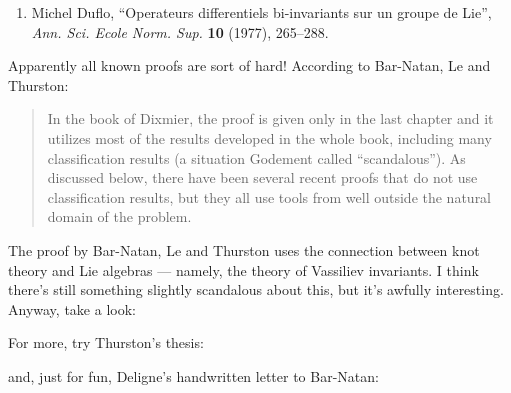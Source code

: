 \documentclass{article}
\def\tightlist{}
\renewcommand{\texttt}[1]{%
  \begingroup
  \ttfamily
  \begingroup\lccode`~=`/\lowercase{\endgroup\def~}{/\discretionary{}{}{}}%
  \begingroup\lccode`~=`[\lowercase{\endgroup\def~}{[\discretionary{}{}{}}%
  \begingroup\lccode`~=`.\lowercase{\endgroup\def~}{.\discretionary{}{}{}}%
  \catcode`/=\active\catcode`[=\active\catcode`.=\active
  \scantokens{#1\noexpand}%
  \endgroup
}
\begin{document}
\begin{enumerate}
\def\labelenumi{\arabic{enumi})}
\setcounter{enumi}{4}
\tightlist
\item
  Michel Duflo, ``Operateurs differentiels bi-invariants sur un groupe
  de Lie'', \emph{Ann. Sci. Ecole Norm. Sup.} \textbf{10} (1977),
  265--288.
\end{enumerate}

Apparently all known proofs are sort of hard! According to Bar-Natan, Le
and Thurston:

\begin{quote}
In the book of Dixmier, the proof is given only in the last chapter and
it utilizes most of the results developed in the whole book, including
many classification results (a situation Godement called
``scandalous''). As discussed below, there have been several recent
proofs that do not use classification results, but they all use tools
from well outside the natural domain of the problem.
\end{quote}

The proof by Bar-Natan, Le and Thurston uses the connection between knot
theory and Lie algebras --- namely, the theory of Vassiliev invariants.
I think there's still something slightly scandalous about this, but it's
awfully interesting. Anyway, take a look:


For more, try Thurston's thesis:


and, just for fun, Deligne's handwritten letter to Bar-Natan:
\end{document}
